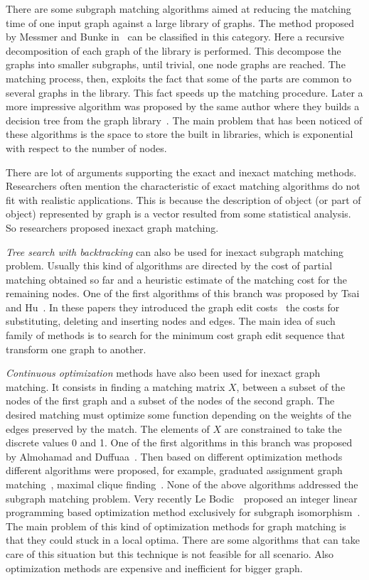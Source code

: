 There are some subgraph matching algorithms aimed at reducing the matching time of one input graph against a large library of graphs. The method proposed by Messmer and Bunke in~\cite{Messmer2000} can be classified in this category. Here a recursive decomposition of each graph of the library is performed. This decompose the graphs into smaller subgraphs, until trivial, one node graphs are reached. The matching process, then, exploits the fact that some of the parts are common to several graphs in the library. This fact speeds up the matching procedure. Later a more impressive algorithm was proposed by the same author where they builds a decision tree from the graph library~\cite{Messmer1999}. The main problem that has been noticed of these algorithms is the space to store the built in libraries, which is exponential with respect to the number of nodes.

There are lot of arguments supporting the exact and inexact matching methods. Researchers often mention the characteristic of exact matching algorithms do not fit with realistic applications. This is because the description of object (or part of object) represented by graph is a vector resulted from some statistical analysis. So researchers proposed inexact graph matching.

\emph{Tree search with backtracking} can also be used for inexact subgraph matching problem. Usually this kind of algorithms are directed by the cost of partial matching obtained so far and a heuristic estimate of the matching cost for the remaining nodes. One of the first algorithms of this branch was proposed by Tsai and Hu~\cite{Tsai1979,Tsai1983}. In these papers they introduced the graph edit costs \ie~the costs for substituting, deleting and inserting nodes and edges. The main idea of such family of methods is to search for the minimum cost graph edit sequence that transform one graph to another.

\emph{Continuous optimization} methods have also been used for inexact graph matching. It consists in finding a matching matrix $X$, between a subset of the nodes of the first graph and a subset of the nodes of the second graph. The desired matching must optimize some function depending on the weights of the edges preserved by the match. The elements of $X$ are constrained to take the discrete values 0 and 1. One of the first algorithms in this branch was proposed by Almohamad and Duffuaa~\cite{Almohamad1993}. Then based on different optimization methods different algorithms were proposed, for example, graduated assignment graph matching~\cite{Gold1996}, maximal clique finding~\cite{Bomze2000,Pelillo1995}. None of the above algorithms addressed the subgraph matching problem. Very recently Le Bodic~\etal~proposed an integer linear programming based optimization method exclusively for subgraph isomorphism~\cite{LeBodic2012}. The main problem of this kind of optimization methods for graph matching is that they could stuck in a local optima. There are some algorithms that can take care of this situation but this technique is not feasible for all scenario. Also optimization methods are expensive and inefficient for bigger graph.

